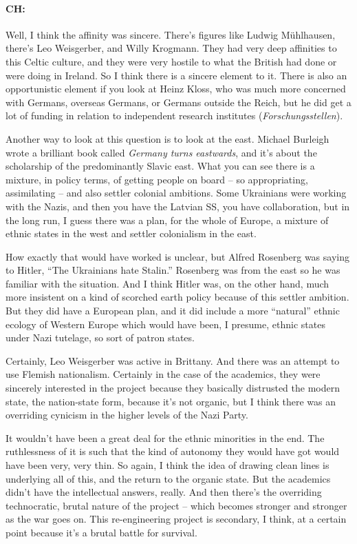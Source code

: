 \documentclass[output=paper]{langscibook}
\begin{document}
\paragraph*{CH:} Well, I think the affinity was sincere. There’s figures like Ludwig Mühlhausen, there’s Leo Weisgerber, and Willy Krogmann. They had very deep affinities to this Celtic culture, and they were very hostile to what the British had done or were doing in Ireland. So I think there is a sincere element to it. There is also an opportunistic element if you look at Heinz Kloss, who was much more concerned with Germans, overseas Germans, or Germans outside the Reich, but he did get a lot of funding in relation to independent research institutes (\textit{Forschungsstellen}).

Another way to look at this question is to look at the east. Michael Burleigh wrote a brilliant book called \textit{Germany turns eastwards}, and it’s about the scholarship of the predominantly Slavic east. What you can see there is a mixture, in policy terms, of getting people on board – so appropriating, assimilating – and also settler colonial ambitions. Some Ukrainians were working with the Nazis, and then you have the Latvian SS, you have collaboration, but in the long run, I guess there was a plan, for the whole of Europe, a mixture of ethnic states in the west and settler colonialism in the east. 

How exactly that would have worked is unclear, but Alfred Rosenberg was saying to Hitler, “The Ukrainians hate Stalin.” Rosenberg was from the east so he was familiar with the situation. And I think Hitler was, on the other hand, much more insistent on a kind of scorched earth policy because of this settler ambition. But they did have a European plan, and it did include a more “natural” ethnic ecology of Western Europe which would have been, I presume, ethnic states under Nazi tutelage, so sort of patron states. 

Certainly, Leo Weisgerber was active in Brittany. And there was an attempt to use Flemish nationalism. Certainly in the case of the academics, they were sincerely interested in the project because they basically distrusted the modern state, the nation-state form, because it’s not organic, but I think there was an overriding cynicism in the higher levels of the Nazi Party. 

It wouldn’t have been a great deal for the ethnic minorities in the end. The ruthlessness of it is such that the kind of autonomy they would have got would have been very, very thin. So again, I think the idea of drawing clean lines is underlying all of this, and the return to the organic state. But the academics didn’t have the intellectual answers, really. And then there’s the overriding technocratic, brutal nature of the project – which becomes stronger and stronger as the war goes on. This re-engineering project is secondary, I think, at a certain point because it’s a brutal battle for survival. 
\end{document}
